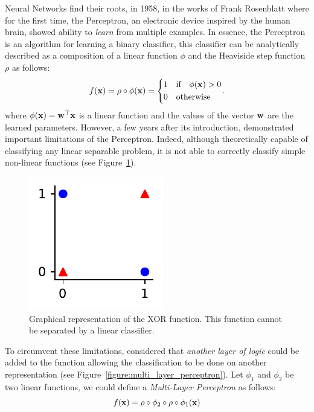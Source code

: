 Neural Networks find their roots, in 1958, in the works of Frank Rosenblatt \cite{rosenblatt1958perceptron} where for the first time, the Perceptron, an electronic device inspired by the human brain, showed ability to \emph{learn} from multiple examples.
In essence, the Perceptron is an algorithm for learning a binary classifier, this classifier can be analytically described as a composition of a linear function $\phi$ and the Heaviside step function $\rho$ as follows:
\begin{equation}
  f(\xvec) = \rho \circ \phi(\xvec) = \left\{ 
    \begin{aligned}
      &1 \quad \text{if} \quad \phi(\xvec) > 0  \\
      &0 \quad \text{otherwise}
    \end{aligned}
    \right. .
\end{equation}
where $\phi(\mathbf{x}) = \mathbf{w}^\top \mathbf{x}$ is a linear function and the values of the vector $\mathbf{w}$ are the learned parameters. 
However, a few years after its introduction, \citet{minsky1969perceptrons} demonstrated important limitations of the Perceptron.
Indeed, although theoretically capable of classifying any linear separable problem, it is not able to correctly classify simple non-linear functions (see Figure~\ref{figure:xor_function}).
\begin{figure}[htb]
  \centering
  \includegraphics{figures/chapter1/xor_function.pdf}
  \caption{Graphical representation of the XOR function. This function cannot be separated by a linear classifier.}
  \label{figure:xor_function}
\end{figure}
To circumvent these limitations, \citet{minsky1969perceptrons} considered that \emph{another layer of logic} could be added to the function allowing the classification to be done on another representation (see Figure~\ref{figure:multi_layer_perceptron}).
Let $\phi_1$ and $\phi_2$ be two linear functions, we could define a \emph{Multi-Layer Perceptron} as follows:
\begin{equation}
  f(\mathbf{x}) = \rho \circ \phi_2 \circ \rho \circ \phi_1( \mathbf{x} )
\end{equation}

